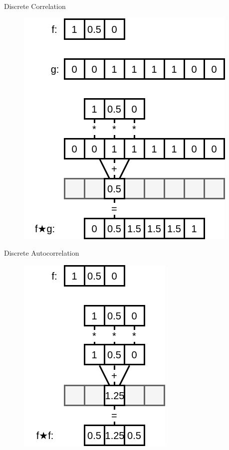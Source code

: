\documentclass[aspectratio=169]{beamer}
\begin{document}
\begin{frame}{Discrete Correlation}
    \begin{figure}
        \centering
        \includegraphics[height=0.7\textheight]{correlation.png}
    \end{figure}
\end{frame}

\begin{frame}{Discrete Autocorrelation}
    \begin{figure}
        \centering
        \includegraphics[height=0.7\textheight]{autocorrelation.png}
    \end{figure}
\end{frame}
\end{document}
